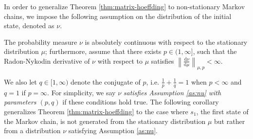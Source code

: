 


In order to generalize Theorem \ref{thm:matrix-hoeffding} to non-stationary Markov chains, we impose the following assumption on the distribution of the initial state, denoted as $\nu$.
\medskip
\begin{customassumption}\label{as:nu}
The probability measure $\nu$ is absolutely continuous with respect to the stationary distribution $\mu$; furthermore, assume that there exists $p \in (1,\infty]$, such that the Radon-Nykodin derivative of $\nu$ with respect to $\mu$ satisfies 
	$\left\|\frac{\mathrm{d}\nu}{\mathrm{d}\mu}\right\|_{\mu,p} < \infty.$
\end{customassumption}
\medskip
We also let $q \in [1,\infty)$ denote the conjugate of $p$, i.e. $\frac{1}{p} + \frac{1}{q} = 1$ when $p < \infty$ and  $q = 1$ if $p = \infty$.  For simplicity, we say $\nu$ \emph{satisfies Assumption \ref{as:nu} with parameters $(p,q)$} if these conditions hold true.  The following corollary generalizes Theorem \ref{thm:matrix-hoeffding} to the case where $s_1$, the first state of the Markov chain, is not generated from the stationary distribution $\mu$ but rather from a distribution $\nu$ satisfying Assumption \ref{as:nu}. 

